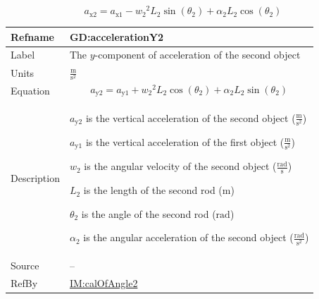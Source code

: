 \documentclass[12pt]{article}
\begin{document}
\begin{displaymath}
{a_{\text{x}2}}={a_{\text{x}1}}-{w_{2}}^{2} {L_{2}} \sin\left({θ_{2}}\right)+{α_{2}} {L_{2}} \cos\left({θ_{2}}\right)
\end{displaymath}
\vspace{\baselineskip}
\noindent
\begin{minipage}{\textwidth}
\begin{tabular}{>{\raggedright}p{}>{\raggedright\arraybackslash}p{}}
\toprule \textbf{Refname} & \textbf{GD:accelerationY2}
\label{GD:accelerationY2}
\\ \midrule
Label & The $y$-component of acceleration of the second object
        
\\ \midrule
Units & $\frac{\text{m}}{\text{s}^{2}}$
        
\\ \midrule
Equation & \begin{displaymath}
           {a_{\text{y}2}}={a_{\text{y}1}}+{w_{2}}^{2} {L_{2}} \cos\left({θ_{2}}\right)+{α_{2}} {L_{2}} \sin\left({θ_{2}}\right)
           \end{displaymath}
\\ \midrule
Description & \begin{symbDescription}
              \item{${a_{\text{y}2}}$ is the vertical acceleration of the second object ($\frac{\text{m}}{\text{s}^{2}}$)}
              \item{${a_{\text{y}1}}$ is the vertical acceleration of the first object ($\frac{\text{m}}{\text{s}^{2}}$)}
              \item{${w_{2}}$ is the angular velocity of the second object ($\frac{\text{rad}}{\text{s}}$)}
              \item{${L_{2}}$ is the length of the second rod (${\text{m}}$)}
              \item{${θ_{2}}$ is the angle of the second rod (${\text{rad}}$)}
              \item{${α_{2}}$ is the angular acceleration of the second object ($\frac{\text{rad}}{\text{s}^{2}}$)}
              \end{symbDescription}
\\ \midrule
Source & --
         
\\ \midrule
RefBy & \hyperref[IM:calOfAngle2]{IM:calOfAngle2}
        
\\ \bottomrule
\end{tabular}
\end{minipage}
\end{document}
